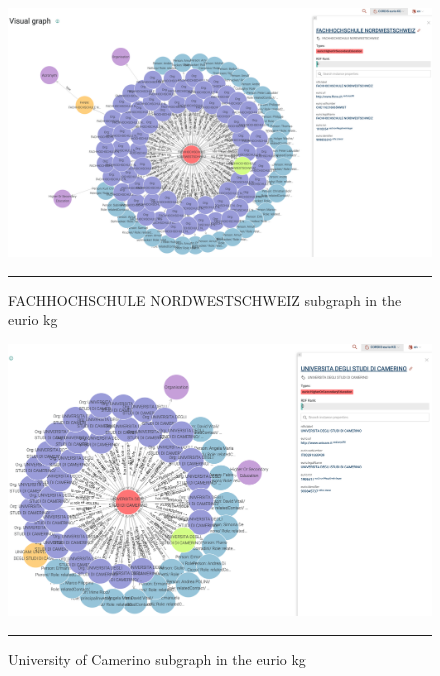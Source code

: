 \begin{figure}[htbp]
    \centering
 \includegraphics[width=.9\textwidth]{figures/architecture/graphdb-fhnw.png}
     \rule{35em}{0.5pt}
    \caption{FACHHOCHSCHULE NORDWESTSCHWEIZ subgraph in the \gls{eurio} \gls{kg}}
 \label{fig:fhnw-graphdb}
\end{figure}

\begin{figure}[htbp]
    \centering
 \includegraphics[width=.9\textwidth]{figures/architecture/graphdb-unicam.png}
     \rule{35em}{0.5pt}
    \caption{University of Camerino subgraph in the \gls{eurio} \gls{kg}}
 \label{fig:unicam-graphdb}
\end{figure}


